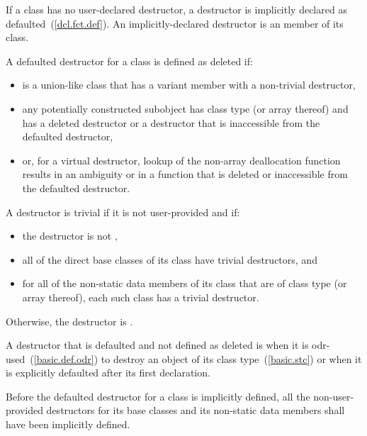 \pnum
{}%
%
%
If a class has no user-declared
destructor, a destructor is implicitly
declared as defaulted~(\ref{dcl.fct.def}).
An implicitly-declared destructor is an
member of its class.

\pnum
A defaulted destructor for a class
   is defined as deleted if:
\begin{itemize}
\item {} is a union-like class that has a variant
  member with a non-trivial destructor,

\item any potentially constructed subobject has class type
   (or array thereof) and
   has a deleted destructor or a destructor
  that is inaccessible from the defaulted destructor,

\item or, for a virtual destructor, lookup of the non-array deallocation
  function results in an ambiguity or in a function that is deleted or
  inaccessible from the defaulted destructor.
\end{itemize}

A destructor is trivial if it is not user-provided and if:

\begin{itemize}
\item the destructor is not ,

\item all of the direct base classes of its class have trivial destructors, and

\item for all of the non-static data members of its class that are of class
type (or array thereof), each such class has a trivial destructor.
\end{itemize}

Otherwise, the destructor is
.

\pnum
{}%
A destructor
that is defaulted and not defined as deleted
is
when it is odr-used~(\ref{basic.def.odr}) to destroy an object of its class type~(\ref{basic.stc})
or when it is explicitly defaulted after its first declaration.

\pnum
Before the
defaulted destructor for a class is implicitly defined, all the non-user-provided
destructors for its base classes and its non-static data members shall have been
implicitly defined.

